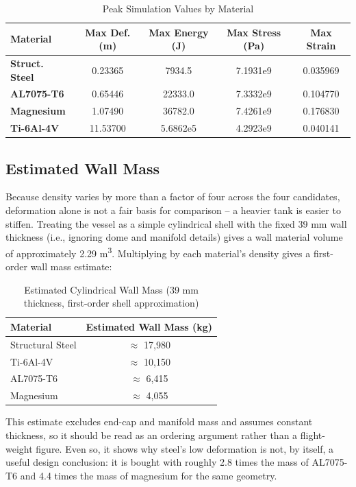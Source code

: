\documentclass[conference]{IEEEtran}
\begin{document}
\begin{table}[htbp]
\centering
\caption{Peak Simulation Values by Material}
\label{tab:results}
\begin{tabular}{@{}lcccc@{}}
\toprule
\textbf{Material} & \textbf{Max Def. (m)} & \textbf{Max Energy (J)} & \textbf{Max Stress (Pa)} & \textbf{Max Strain} \\
\midrule
\textbf{Struct. Steel} & 0.23365 & 7934.5 & 7.1931e9 & 0.035969 \\
\textbf{AL7075-T6} & 0.65446 & 22333.0 & 7.3332e9 & 0.104770 \\
\textbf{Magnesium} & 1.07490 & 36782.0 & 7.4261e9 & 0.176830 \\
\textbf{Ti-6Al-4V} & 11.53700 & 5.6862e5 & 4.2923e9 & 0.040141 \\
\bottomrule
\end{tabular}
\end{table}

\subsection{Estimated Wall Mass}
Because density varies by more than a factor of four across the four candidates, deformation alone is not a fair basis for comparison -- a heavier tank is easier to stiffen. Treating the vessel as a simple cylindrical shell with the fixed 39 mm wall thickness (i.e., ignoring dome and manifold details) gives a wall material volume of approximately 2.29 m\textsuperscript{3}. Multiplying by each material's density gives a first-order wall mass estimate:

\begin{table}[htbp]
\centering
\caption{Estimated Cylindrical Wall Mass (39 mm thickness, first-order shell approximation)}
\label{tab:mass}
\begin{tabular}{@{}lc@{}}
\toprule
\textbf{Material} & \textbf{Estimated Wall Mass (kg)} \\
\midrule
Structural Steel & $\approx$ 17{,}980 \\
Ti-6Al-4V & $\approx$ 10{,}150 \\
AL7075-T6 & $\approx$ 6{,}415 \\
Magnesium & $\approx$ 4{,}055 \\
\bottomrule
\end{tabular}
\end{table}

This estimate excludes end-cap and manifold mass and assumes constant thickness, so it should be read as an ordering argument rather than a flight-weight figure. Even so, it shows why steel's low deformation is not, by itself, a useful design conclusion: it is bought with roughly 2.8 times the mass of AL7075-T6 and 4.4 times the mass of magnesium for the same geometry.
\end{document}
